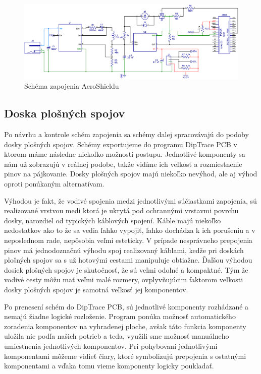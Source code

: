 \begin{figure}[!tbh]
\includegraphics[width=\textwidth]{obr/aeroSchema.png}
\caption{Schéma zapojenia AeroShieldu}\label{OBRAZOK 2.3}
\end{figure}

\subsection{Doska plošných spojov}

Po návrhu a kontrole schém zapojenia sa schémy dalej spracovávajú do podoby dosky plošných spojov. Schémy exportujeme do programu DipTrace PCB v ktorom máme následne niekoľko možností postupu. Jednotlivé komponenty sa nám už zobrazujú v reálnej podobe, takže vidíme ich veľkosť a rozmiestnenie pinov na pájkovanie. Dosky plošných spojov majú niekoľko nevýhod, ale aj výhod oproti ponúkaným alternatívam\cite{dosky}. 

Výhodou je fakt, že vodivé spojenia medzi jednotlivými súčiastkami zapojenia, sú realizované vrstvou medi ktorá je ukrytá pod ochrannými vrstavmi povrchu dosky, narozdiel od typických káblových spojení. Káble majú niekoľko nedostatkov ako to že sa vedia ľahko vypojiť, ľahko dochádza k ich porušeniu a v neposlednom rade, nepôsobia veľmi esteticky. V prípade nesprávneho prepojenia pinov má jednodoznačnú výhodu spoj realizovaný káblami, kedže pri doskách plošných spojov sa s už hotovými cestami manipuluje obtiažne. Ďaľšou výhodou dosiek plošných spojov je skutočnosť, že sú veľmi odolné a kompaktné. Tým že vodivé cesty môžu mať veľmi malé rozmery, ovplyvňujúcim faktorom veľkosti dosky plošných spojov je samotná veľkosť jej komponentov. 

Po prenesení schém do DipTrace PCB, sú jednotlivé komponenty rozhádzané a nemajú žiadne logické rozloženie. Program ponúka možnosť automatického zoradenia komponentov na vyhradenej ploche, avšak táto funkcia komponenty uložila nie podľa našich potrieb a teda, využili sme možnosť manuálneho umiestnenia jednotlivých komponentov. Pri pohybovaní jednotlivými komponentami môžeme vidieť čiary, ktoré symbolizujú prepojenia s ostatnými komponentami a vďaka tomu vieme komponenty logicky poukladať.

